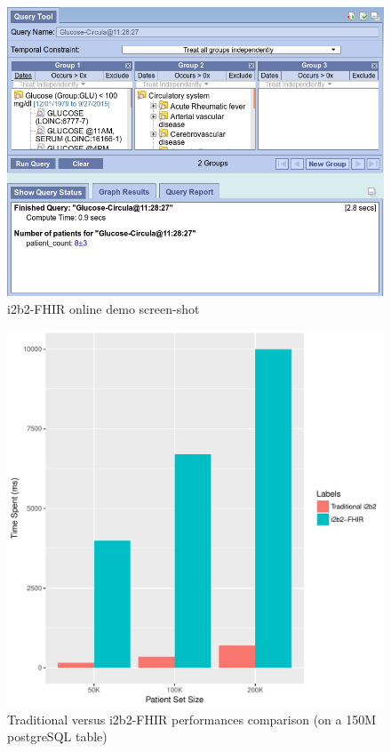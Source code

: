 \documentclass{amia}
\begin{document}
\begin{figure}[h]
\centering
\includegraphics[scale=.4]{demo.png}
	\caption{i2b2-FHIR online demo screen-shot}
\label{fig3}
\end{figure}
\begin{figure}[h]
\centering
\includegraphics[scale=.6]{graph2.pdf}
	\caption{Traditional versus i2b2-FHIR performances comparison (on a 150M postgreSQL table)}
\label{fig1}
\end{figure}
\end{document}
